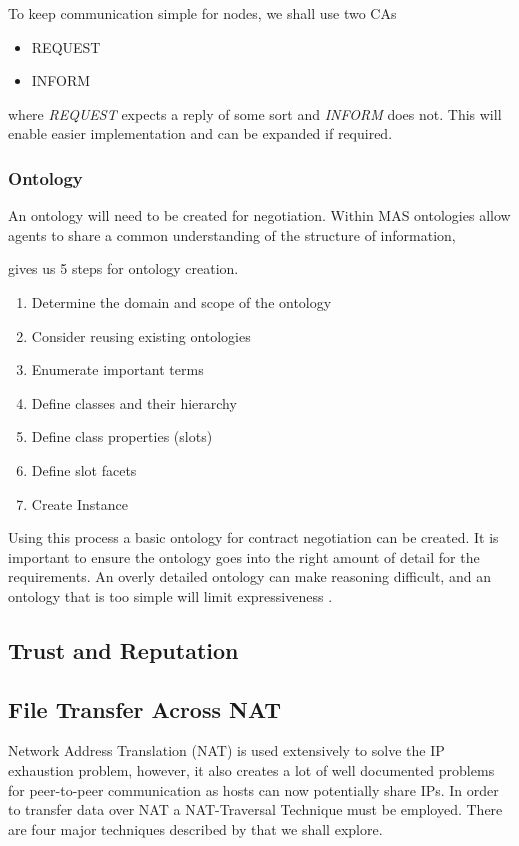 \documentclass[a4paper,11pt, twocolumn]{report}
\begin{document}
To keep communication simple for nodes, we shall use two CAs
\begin{itemize}
  \item REQUEST
  \item INFORM
\end{itemize}
where \emph{REQUEST} expects a reply of some sort and \emph{INFORM} does not. This will enable easier implementation and can be expanded if required.

\subsubsection{Ontology}

An ontology will need to be created for negotiation. Within MAS ontologies allow agents to share a common understanding of the structure of information,



\cite{noy2001ontology} gives us 5 steps for ontology creation.

\begin{enumerate}
 \item Determine the domain and scope of the ontology
 \item Consider reusing existing ontologies
 \item Enumerate important terms
 \item Define classes and their hierarchy
 \item Define class properties (slots)
 \item Define slot facets
 \item Create Instance
\end{enumerate}

Using this process a basic ontology for contract negotiation can be created. It is important to ensure the ontology goes into the right amount of detail for the requirements. An overly detailed ontology can make reasoning difficult, and an ontology that is too simple will limit expressiveness \citep{wooldridge2009introduction}.

\subsection{Trust and Reputation}

\subsection{File Transfer Across NAT}
Network Address Translation (NAT) is used extensively to solve the IP exhaustion problem, however, it also creates a lot of well documented problems for peer-to-peer communication as hosts can now potentially share IPs. In order to transfer data over NAT a NAT-Traversal Technique must be employed. There are four major techniques described by \cite{ford2005peer} that we shall explore.
\end{document}

